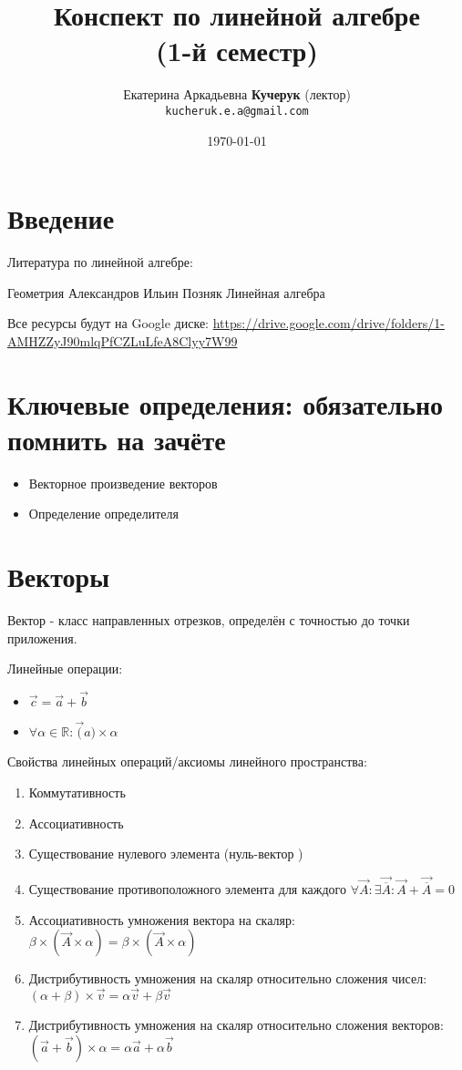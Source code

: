 \documentclass[12pt, a4paper]{article}
\title{Конспект по линейной алгебре \\ (1-й семестр)}
\author{
  \vova
  \and
  Екатерина Аркадьевна \textbf{Кучерук} (лектор)\\
  \texttt{kucheruk.e.a@gmail.com}
}
\date{\today}
\begin{document}
    \tittoc

    \section{Введение}

    Литература по линейной алгебре:

    Геометрия Александров
    Ильин Позняк  Линейная алгебра

    Все ресурсы будут на Google диске: \url{https://drive.google.com/drive/folders/1-AMHZZyJ90mlqPfCZLuLfeA8Clyy7W99}

    \section{Ключевые определения: обязательно помнить на зачёте}
    \begin{itemize}
        \item Векторное произведение векторов
        \item Определение определителя
    \end{itemize}

    \section{Векторы}
    
    Вектор - класс направленных отрезков, 
    определён с точностью до точки приложения.

    Линейные операции:
    \begin{itemize}
        \item $\vec{c} = \vec{a} + \vec{b}$
        \item $\forall \alpha \in \mathbb{R}: \vec(a) \times \alpha$
    \end{itemize}

    Свойства линейных операций/аксиомы линейного пространства:
    \begin{enumerate}
        \item Коммутативность
        \item Ассоциативность
        \item Существование нулевого элемента (нуль-вектор  )
        \item Существование противоположного элемента для каждого 
                $\forall \vec{A}: \exists \vec{\overline{A}}: \vec{A} + \vec{\overline{A}} = 0$
        \item Ассоциативность умножения вектора на скаляр: $\beta \times (\vec{A} \times \alpha) = \beta \times (\vec{A} \times \alpha)$
        \item Дистрибутивность умножения на скаляр относительно сложения чисел: $(\alpha + \beta) \times \vec{v}  = \alpha \vec{v} + \beta \vec{v}$
        \item Дистрибутивность умножения на скаляр относительно сложения векторов: $(\vec{a} + \vec{b}) \times \alpha  = \alpha \vec{a} + \alpha \vec{b}$
    \end{enumerate}
    
\end{document}
